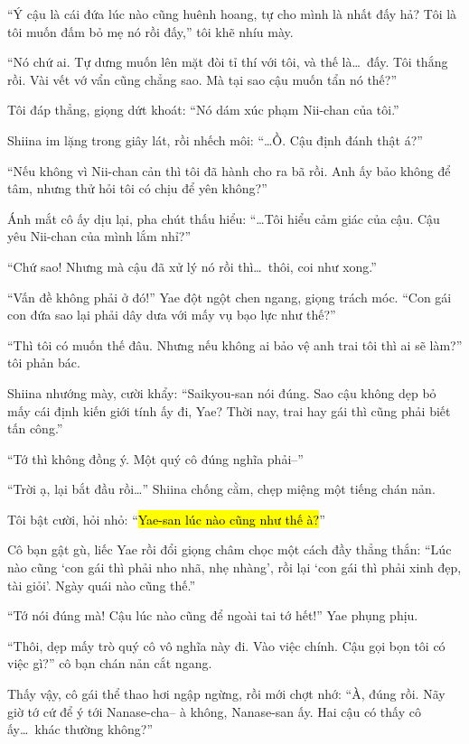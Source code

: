 \documentclass[../main.tex]{subfiles}
\begin{document}
``Ý cậu là cái đứa lúc nào cũng huênh hoang, tự cho mình là nhất đấy hả? Tôi là tôi muốn đấm bỏ mẹ nó rồi đấy,'' tôi khẽ nhíu mày.

``Nó chứ ai. Tự dưng muốn lên mặt đòi tỉ thí với tôi, và thế là\dots\ đấy. Tôi thắng rồi. Vài vết vớ vẩn cũng chẳng sao. Mà tại sao cậu muốn tẩn nó thế?''

Tôi đáp thẳng, giọng dứt khoát: ``Nó dám xúc phạm Nii-chan của tôi.''

Shiina im lặng trong giây lát, rồi nhếch môi: ``\dots Ồ. Cậu định đánh thật á?''

``Nếu không vì Nii-chan cản thì tôi đã hành cho ra bã rồi. Anh ấy bảo không để tâm, nhưng thử hỏi tôi có chịu để yên không?''

Ánh mắt cô ấy dịu lại, pha chút thấu hiểu: ``\dots Tôi hiểu cảm giác của cậu. Cậu yêu Nii-chan của mình lắm nhỉ?''

``Chứ sao! Nhưng mà cậu đã xử lý nó rồi thì\dots\ thôi, coi như xong.''

``Vấn đề không phải ở đó!'' Yae đột ngột chen ngang, giọng trách móc. ``Con gái con đứa sao lại phải dây dưa với mấy vụ bạo lực như thế?''

``Thì tôi có muốn thế đâu. Nhưng nếu không ai bảo vệ anh trai tôi thì ai sẽ làm?'' tôi phản bác.

Shiina nhướng mày, cười khẩy: ``Saikyou-san nói đúng. Sao cậu không dẹp bỏ mấy cái định kiến giới tính ấy đi, Yae? Thời nay, trai hay gái thì cũng phải biết tấn công.''

``Tớ thì không đồng ý. Một quý cô đúng nghĩa phải--''

``Trời ạ, lại bắt đầu rồi\dots'' Shiina chống cằm, chẹp miệng một tiếng chán nản.

Tôi bật cười, hỏi nhỏ: ``\hl{Yae-san lúc nào cũng như thế à?}''

Cô bạn gật gù, liếc Yae rồi đổi giọng châm chọc một cách đầy thẳng thắn: ``Lúc nào cũng `con gái thì phải nho nhã, nhẹ nhàng', rồi lại `con gái thì phải xinh đẹp, tài giỏi'. Ngày quái nào cũng thế.''

``Tớ nói đúng mà! Cậu lúc nào cũng để ngoài tai tớ hết!'' Yae phụng phịu.

``Thôi, dẹp mấy trò quý cô vô nghĩa này đi. Vào việc chính. Cậu gọi bọn tôi có việc gì?'' cô bạn chán nản cắt ngang.

Thấy vậy, cô gái thể thao hơi ngập ngừng, rồi mới chợt nhớ: ``À, đúng rồi. Nãy giờ tớ cứ để ý tới Nanase-cha-- à không, Nanase-san ấy. Hai cậu có thấy cô ấy\dots\ khác thường không?''
\end{document}
